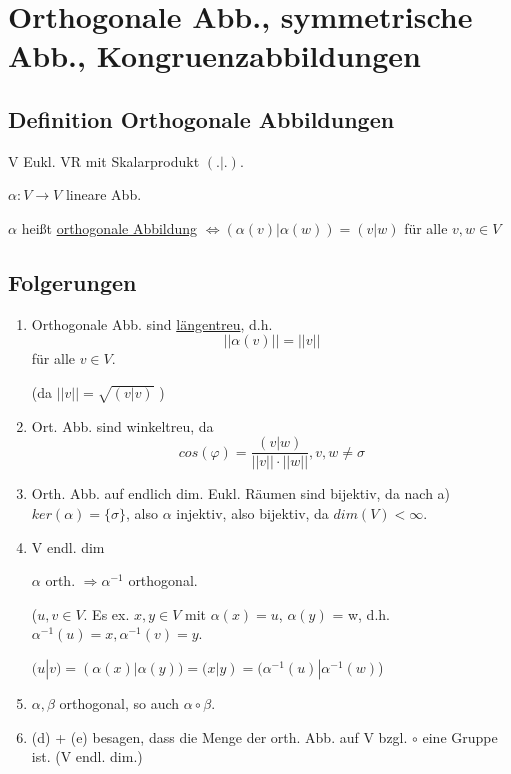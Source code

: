 \documentclass[a4paper, openany]{book}
\begin{document}
        \chapter{Orthogonale Abb., symmetrische Abb., Kongruenzabbildungen}

        \section{Definition Orthogonale Abbildungen}

        V Eukl. VR mit Skalarprodukt $(.|.)$.

        $\alpha: V \rightarrow V$ lineare Abb.

        \par \medskip

        $\alpha$ heißt \underline{orthogonale Abbildung} $\Leftrightarrow (\alpha(v) | \alpha(w)) = (v | w)$ für alle $v,w \in V$

        \section{Folgerungen}

        \begin{enumerate}[label=(\alph*)]
          \item Orthogonale Abb. sind \underline{längentreu}, d.h. \[ ||\alpha(v)|| = ||v|| \] für alle $v \in V$.

          (da $||v|| = \sqrt{(v|v)}$ )

          \item Ort. Abb. sind winkeltreu, da \[ cos(\varphi) = \frac{(v|w)}{||v|| \cdot ||w||}, v,w \neq \sigma \]

          \item Orth. Abb. auf endlich dim. Eukl. Räumen sind bijektiv, da nach a) $ker(\alpha) = \{\sigma\}$, also $\alpha$ injektiv, also bijektiv, da $dim(V) < \infty$.

          \item V endl. dim

          $\alpha$ orth. $\Rightarrow \alpha^{-1}$ orthogonal.

          ($u,v \in V$. Es ex. $x,y \in V$ mit $\alpha(x) = u$, $\alpha(y)$ = w, d.h. $\alpha^{-1}(u) = x, \alpha^{-1}(v) = y$.

          $(u|v) = (\alpha(x) | \alpha(y)) = (x|y) = (\alpha^{-1}(u)|\alpha^{-1}(w)$)

          \item $\alpha, \beta$ orthogonal, so auch $\alpha \circ \beta$.

          \item (d) + (e) besagen, dass die Menge der orth. Abb. auf V bzgl. $\circ$ eine Gruppe ist. (V endl. dim.)
        \end{enumerate}
\end{document}
